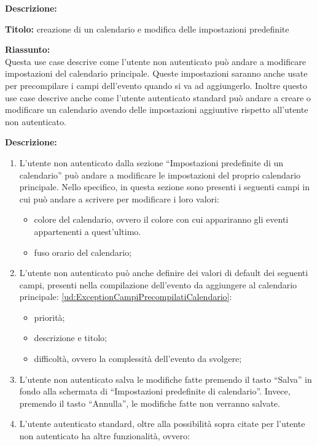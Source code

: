 \begin{listaPersonale}[UC]{}
    \textbf{Descrizione:}

    \textbf{Titolo:} creazione di un calendario e modifica delle impostazioni predefinite

    \textbf{Riassunto:} \\
    Questa use case descrive come l'utente non autenticato può andare a modificare impostazioni del calendario principale. Queste impostazioni saranno anche usate per precompilare i campi dell'evento quando si va ad aggiungerlo. Inoltre questo use case descrive anche come l'utente autenticato standard può andare a creare o modificare un calendario avendo delle impostazioni aggiuntive rispetto all'utente non autenticato.

    \textbf{Descrizione:}
    \begin{enumerate}
        \item L'utente non autenticato dalla sezione  “Impostazioni predefinite di un calendario” può andare a modificare le impostazioni del proprio calendario principale. Nello specifico, in questa sezione sono presenti i seguenti campi in cui può andare a scrivere per modificare i loro valori:
              \begin{itemize}
                  \item colore del calendario, ovvero il colore con cui appariranno gli eventi appartenenti a quest'ultimo.
                  \item fuso orario del calendario;
              \end{itemize}
        \item L'utente non autenticato può anche definire dei valori di default dei seguenti campi, presenti nella compilazione dell'evento da aggiungere al calendario principale: \ref{ud:ExceptionCampiPrecompilatiCalendario}:
              \begin{itemize}
                  \item priorità;
                  \item descrizione e titolo;
                  \item difficoltà, ovvero la complessità dell'evento da svolgere;
              \end{itemize}
        \item L'utente non autenticato salva le modifiche fatte premendo il tasto “Salva” in fondo alla schermata di “Impostazioni predefinite di calendario”. Invece, premendo il tasto “Annulla”, le modifiche fatte non verranno salvate.
        \item L'utente autenticato standard, oltre alla possibilità sopra citate per l'utente non autenticato ha altre funzionalità, ovvero:

\end{enumerate}
\end{listaPersonale}

